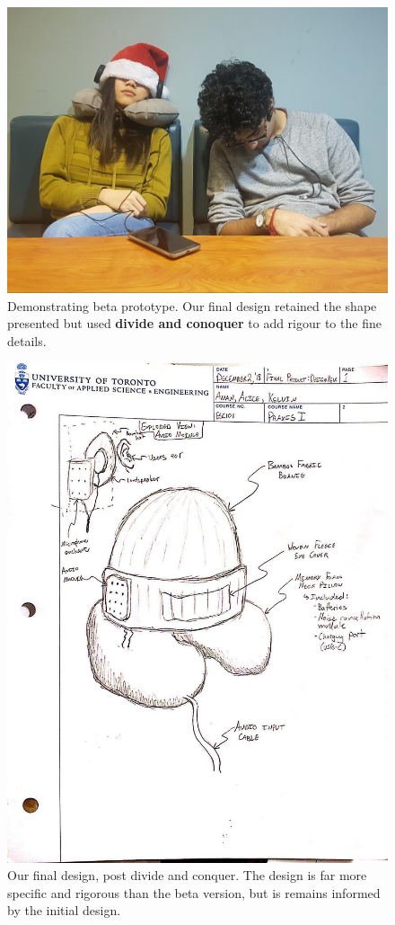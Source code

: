 \documentclass[a4paper,12pt]{article}
\begin{document}
\begin{figure}[H]
\centering
\includegraphics[width=1\textwidth]{img/image002.jpg}
\caption{Demonstrating beta prototype. Our final design retained the shape presented but used \textbf{divide and conoquer} to add rigour to the fine details.}
\label{}
\end{figure}

\begin{figure}[H]
\centering
\includegraphics[width=1\textwidth]{img/image003.jpg}
\caption{Our final design, post divide and conquer. The design is far more specific and rigorous than the beta version, but is remains informed by the initial design.}
\label{}
\end{figure}
\end{document}
